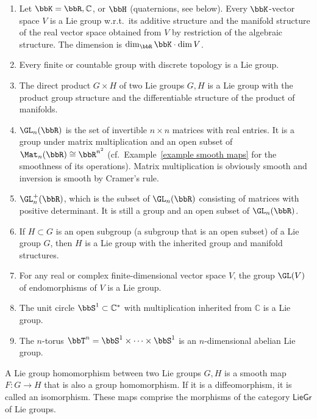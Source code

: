 \begin{example}
    \begin{enumerate}[label=(\alph*)]
        \item Let $\bbK=\bbR ,\mathbb{C}$, or $\bbH $ (quaternions, see below). Every $\bbK$-vector space $V$ is a Lie group w.r.t.\ its additive structure and the manifold structure of the real vector space obtained from $V$ by restriction of the algebraic structure. The dimension is $\dim_{\bbR }\bbK\cdot \dim V$.
        \item Every finite or countable group with discrete topology is a Lie group.
        \item The direct product $G\times H$ of two Lie groups $G,H$ is a Lie group with the product group structure and the differentiable structure of the product of manifolds.
        \item $\GL_n(\bbR )$ is the set of invertible $n\times n$ matrices with real entries. It is a group under matrix multiplication and an open subset of $\Mat_n(\bbR )\cong \bbR^{n^2}$ (cf.\ Example~\ref{example smooth maps} for the smoothness of its operations). Matrix multiplication is obviously smooth and inversion is smooth by Cramer's rule.
        \item $\GL^+_n(\bbR )$, which is the subset of $\GL_n(\bbR )$ consisting of matrices with positive determinant. It is still a group and an open subset of $\GL_n(\bbR )$.
        \item If $H\subset G$ is an open subgroup (a subgroup that is an open subset) of a Lie group $G$, then $H$ is a Lie group with the inherited group and manifold structures.
        \item For any real or complex finite-dimensional vector space $V$, the group $\GL(V)$ of endomorphisms of $V$ is a Lie group.
        \item The unit circle $\bbS^1\subset \mathbb{C}^\ast$ with multiplication inherited from $\mathbb{C}$ is a Lie group.
        \item The $n$-torus $\bbT^n=\bbS^1\times\cdots\times \bbS^1$ is an $n$-dimensional abelian Lie group.
    \end{enumerate}
\end{example}

\begin{defn}
    A Lie group homomorphism between two Lie groups $G,H$ is a smooth map $F:G\to H$ that is also a group homomorphism. If it is a diffeomorphism, it is called an isomorphism. These maps comprise the morphisms of the category $\mathsf{LieGr}$ of Lie groups.
\end{defn} 

